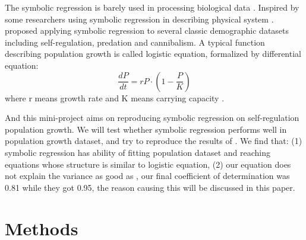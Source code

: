 \documentclass[11pt,a4paper]{article}
\begin{document}
The symbolic regression is barely used in processing biological data \citep{Liu2016}. Inspired by some researchers using symbolic regression in describing physical system \citep{Schmidt2009}. \citet{BenjaminT.MartinStephanB.Munch2018} proposed applying symbolic regression to several classic demographic datasets including self-regulation, predation and cannibalism. A typical function describing population growth is called logistic equation, formalized by differential equation:
\begin{equation}
\frac{dP}{dt} = rP \cdot (1- \frac{P}{K})
\end{equation}
where r means growth rate and K means carrying capacity \citep{mckendrick_pai_1912}.

And this mini-project aims on reproducing symbolic regression on self-regulation population growth. We will test whether symbolic regression performs well in population growth dataset, and try to reproduce the results of \citet{BenjaminT.MartinStephanB.Munch2018}. We find that: (1) symbolic regression has ability of fitting population dataset and reaching equations whose structure is similar to logistic equation, (2) our equation does not explain the variance as good as \citet{BenjaminT.MartinStephanB.Munch2018}, our final coefficient of determination was 0.81 while they got 0.95, the reason causing this will be discussed in this paper.

\section{Methods}
\end{document}
